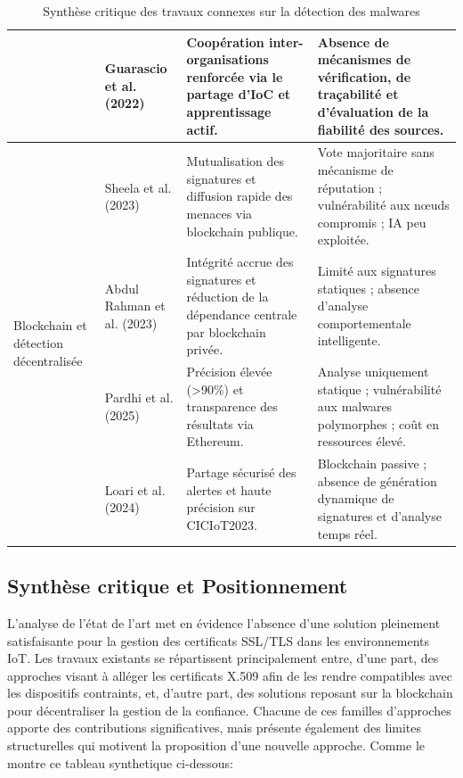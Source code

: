 \documentclass[12pt]{report}
\begin{document}
\begin{itemize}
\begin{itemize}
\begin{table}[htbp]
\begin{tabular}{|p{2cm}|p{2cm}|p{4.2cm}|p{5.3cm}|}
& Guarascio et al. (2022) 
& Coopération inter-organisations renforcée via le partage d’IoC et apprentissage actif. 
& Absence de mécanismes de vérification, de traçabilité et d’évaluation de la fiabilité des sources. \\ \hline

\multirow{4}{3cm}{Blockchain et détection décentralisée} 
& Sheela et al. (2023) 
& Mutualisation des signatures et diffusion rapide des menaces via blockchain publique. 
& Vote majoritaire sans mécanisme de réputation ; vulnérabilité aux nœuds compromis ; IA peu exploitée. \\ \cline{2-4}

& Abdul Rahman et al. (2023) 
& Intégrité accrue des signatures et réduction de la dépendance centrale par blockchain privée. 
& Limité aux signatures statiques ; absence d’analyse comportementale intelligente. \\ \cline{2-4}

& Pardhi et al. (2025) 
& Précision élevée (>90\%) et transparence des résultats via Ethereum. 
& Analyse uniquement statique ; vulnérabilité aux malwares polymorphes ; coût en ressources élevé. \\ \cline{2-4}

& Loari et al. (2024) 
& Partage sécurisé des alertes et haute précision sur CICIoT2023. 
& Blockchain passive ; absence de génération dynamique de signatures et d’analyse temps réel. \\ \hline

\end{tabular}
\caption{Synthèse critique des travaux connexes sur la détection des malwares}
\label{tab:malware_related_work}
\end{table}


\subsection{Synthèse critique et Positionnement}

L’analyse de l’état de l’art met en évidence l’absence d’une solution pleinement satisfaisante pour la gestion des certificats SSL/TLS dans les environnements IoT. Les travaux existants se répartissent principalement entre, d’une part, des approches visant à alléger les certificats X.509 afin de les rendre compatibles avec les dispositifs contraints, et, d’autre part, des solutions reposant sur la blockchain pour décentraliser la gestion de la confiance. Chacune de ces familles d’approches apporte des contributions significatives, mais présente également des limites structurelles qui motivent la proposition d’une nouvelle approche. Comme le montre ce tableau synthetique ci-dessous:



\end{itemize}
\end{itemize}
\end{document}
